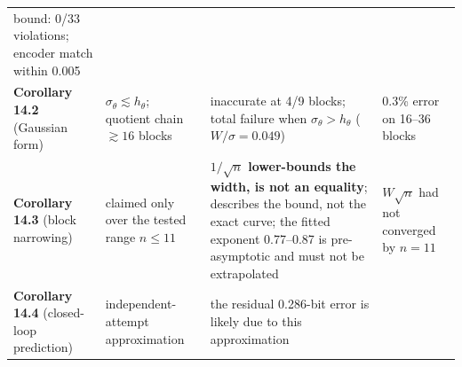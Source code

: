 \documentclass[11pt]{article}
\begin{document}
\begin{longtable}[]{@{}llll@{}}
\begin{minipage}[t]{0.22\columnwidth}
bound: 0/33 violations; encoder match within 0.005\strut
\end{minipage}\tabularnewline
\begin{minipage}[t]{0.22\columnwidth}\raggedright
\textbf{Corollary 14.2} (Gaussian form)\strut
\end{minipage} & \begin{minipage}[t]{0.22\columnwidth}\raggedright
\textbf{\(\sigma_\theta\lesssim h_\theta\)}; quotient chain \(\gtrsim16\) blocks\strut
\end{minipage} & \begin{minipage}[t]{0.22\columnwidth}\raggedright
inaccurate at 4/9 blocks; total failure when \(\sigma_\theta>h_\theta\) (\(W/\sigma=0.049\))\strut
\end{minipage} & \begin{minipage}[t]{0.22\columnwidth}\raggedright
0.3\% error on 16--36 blocks\strut
\end{minipage}\tabularnewline
\begin{minipage}[t]{0.22\columnwidth}\raggedright
\textbf{Corollary 14.3} (block narrowing)\strut
\end{minipage} & \begin{minipage}[t]{0.22\columnwidth}\raggedright
claimed only over the tested range \(n\le11\)\strut
\end{minipage} & \begin{minipage}[t]{0.22\columnwidth}\raggedright
\textbf{\(1/\sqrt n\) lower-bounds the width, is not an equality}; describes the bound, not the exact curve; the fitted exponent 0.77--0.87 is pre-asymptotic and must not be extrapolated\strut
\end{minipage} & \begin{minipage}[t]{0.22\columnwidth}\raggedright
\(W\sqrt n\) had not converged by \(n=11\)\strut
\end{minipage}\tabularnewline
\begin{minipage}[t]{0.22\columnwidth}\raggedright
\textbf{Corollary 14.4} (closed-loop prediction)\strut
\end{minipage} & \begin{minipage}[t]{0.22\columnwidth}\raggedright
independent-attempt approximation\strut
\end{minipage} & \begin{minipage}[t]{0.22\columnwidth}\raggedright
the residual 0.286-bit error is likely due to this approximation\strut
\end{minipage} & \begin{minipage}[t]{0.22\columnwidth}\raggedright

\end{minipage}
\end{longtable}
\end{document}

